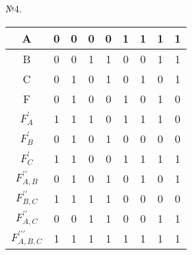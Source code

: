 \documentclass[a4paper,12pt]{report} %
\begin{document}
\begin{multicols}{2}



\bigskip
\centering
№4.\\
\bigskip
\begin{tabular}{|c|c|c|c|c|c|c|c|c|}
\hline
A &0 &0 &0 &0 &1 &1 &1 &1 \\
\hline
B &0 &0 &1 &1 &0 &0 &1 &1 \\
\hline
C &0 &1 &0 &1 &0 &1 &0 &1 \\
\hline
F &0 & 1 & 0 & 0 & 1 &0&1&0 \\
\hline
$F_A^{\prime}$ &1&1&1&0&1&1&1&0\\
\hline
$F_B^{\prime}$ &0&1&0&1&0&0&0&0\\
\hline
$F_C^{\prime}$ & 1&1&0&0&1&1&1&1\\
\hline
$F_{A,B}^{\prime\prime}$ &0&1&0&1&0&1&0&1\\
\hline
$F_{B,C}^{\prime\prime}$ &1&1&1&1&0&0&0&0\\
\hline
$F_{A,C}^{\prime\prime}$ &0&0&1&1&0&0&1&1\\
\hline
$F_{A,B,C}^{\prime\prime\prime}$ &1&1&1&1&1&1&1&1\\

\hline
\end{tabular}\\
\bigskip


\end{multicols}
\end{document}
